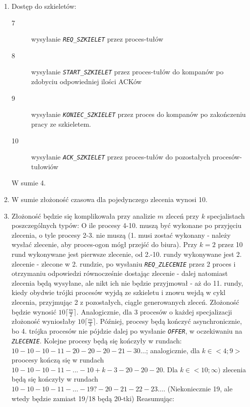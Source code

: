 \documentclass[12pt]{article}
\newcommand{\msg}[1]{\texttt{\emph{#1}}}
\begin{document}
\begin{enumerate}
	\item Dostęp do szkieletów:
	\begin{description}
		\item[7] wysyłanie \msg{REQ\_SZKIELET} przez proces-tułów
		\item[8] wysyłanie \msg{START\_SZKIELET} przez proces-tułów do kompanów po zdobyciu odpowiedniej ilości ACKów
		\item[9] wysyłanie \msg{KONIEC\_SZKIELET} przez proces do kompanów po zakończeniu pracy ze szkieletem.
		\item[10] wysyłanie \msg{ACK\_SZKIELET} przez proces-tułów do pozostałych procesów-tułowiów
	\end{description}
	W sumie 4.
	\item W sumie złożoność czasowa dla pojedynczego zlecenia wynosi 10.
	\item Złożoność będzie się komplikowała przy analizie \(m\) zleceń przy \(k\) specjalistach poszczególnych typów: O ile procesy 4-10. muszą być wykonane po przyjęciu zlecenia, o tyle procesy 2-3. nie muszą (1. musi zostać wykonany - należy wysłać zlecenie, aby proces-ogon mógł przejść do biura). Przy \(k=2\) przez 10 rund wykonywane jest pierwsze zlecenie, od 2.-10. rundy wykonywane jest 2. zlecenie - zlecone w 2. rundzie, po wysłaniu \msg{REQ\_ZLECENIE} przez 2 proces i otrzymaniu odpowiedzi równocześnie dostając zlecenie - dalej natomiast zlecenia będą wysyłane, ale nikt ich nie będzie przyjmował - aż do 11. rundy, kiedy obydwie trójki procesów wyjdą ze szkieletu i znowu wejdą w cykl zlecenia, przyjmując 2 z pozostałych, ciągle generowanych zleceń. Złożoność będzie wynosić \(10\lceil \frac{m}{2} \rceil\). Analogicznie, dla 3 procesów o każdej specjalizacji złożoność wyniosłaby \(10\lceil\frac{m}{3} \rceil\). Później, procesy będą kończyć asynchronicznie, bo 4. trójka procesów nie pójdzie dalej po wysłanie \msg{OFFER}, w oczekiwaniu na \msg{ZLECENIE}. Kolejne procesy będą się kończyły w rundach: \(10-10-10-11-20-20-20-21-30 \dots\); analogicznie, dla \(k \in <4;9>\) proocesy kończą się w rundach \(10-10-10-11-...-10+k-3-20-20-20\). Dla \(k \in <10;\infty)\) zlecenia będą się kończyły w rundach \(10-10-10-11- \dots - 19?-20-21-22-23 \dots\). (Niekoniecznie 19, ale wtedy będzie zamiast 19/18 będą 20-tki) Reasumując:
\end{enumerate}
\end{document}
